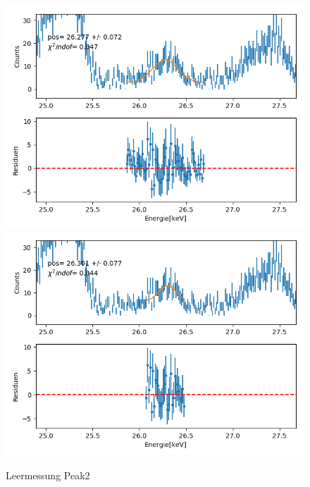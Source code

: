 \documentclass[12pt,a4paper]{article}
\begin{document}
\begin{figure}[H]
\centering
\includegraphics[scale=0.49]{Bilder/alpha_spektren/leer_2_1.png}
\includegraphics[scale=0.49]{Bilder/alpha_spektren/leer_2_2.png}
\caption{Leermessung Peak2}
\end{figure}
\end{document}
